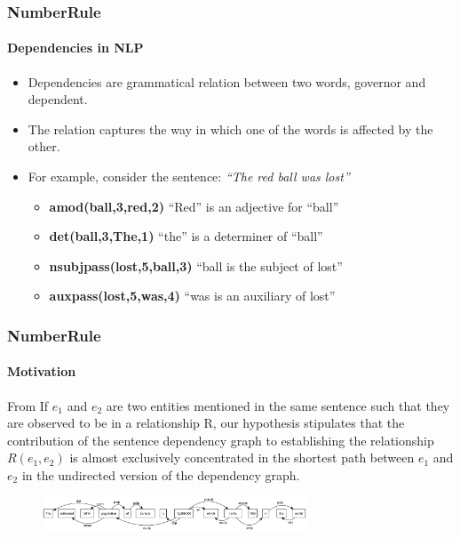 \documentclass{beamer}
\begin{document}
\begin{frame}
 \frametitle{NumberRule}
 \framesubtitle{Dependencies in NLP}
 \begin{itemize}
  \setlength \itemsep{2em}
  \item Dependencies are grammatical relation between two words, governor and dependent.
  \item The relation captures the way in which one of the words is affected by the other.
  \item For example, consider the sentence: \emph{``The red ball was lost''}
    \begin{itemize}
    \setlength \itemsep{1em}
      \item \textbf{amod(ball,3,red,2)} ``Red'' is an adjective for ``ball''
      \item \textbf{det(ball,3,The,1)}  ``the'' is a determiner of ``ball''
      \item \textbf{nsubjpass(lost,5,ball,3)}	``ball is the subject of lost''
      \item \textbf{auxpass(lost,5,was,4)}	``was is an auxiliary of lost''
    \end{itemize}
 \end{itemize}
 
\end{frame}



\begin{frame}
\frametitle{NumberRule}
\framesubtitle{Motivation}

\begin{block}{From \cite{shortestpathdep}}
If $e_1$ and $e_2$ are two entities mentioned in the same
 sentence such that they are observed to be in a relationship R, our hypothesis stipulates that the contribution of the sentence dependency graph to establishing the relationship $R(e_1, e_2)$ is almost exclusively concentrated in the shortest path between $e_1$ and $e_2$ in the undirected version of the dependency graph.
\end{block}
\begin{figure}
\includegraphics[width=0.7\textwidth]{images/dep.eps}
\end{figure}

\end{frame}
\end{document}
